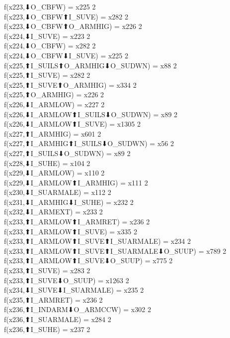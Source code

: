 f(x223,⬇O_CBFW) = x225 {2} \\
f(x223,⬇O_CBFW⬆I_SUVE) = x282 {2} \\
f(x223,⬇O_CBFW⬆O_ARMHIG) = x226 {2} \\
f(x224,⬇I_SUVE) = x223 {2} \\
f(x224,⬇O_CBFW) = x282 {2} \\
f(x224,⬇O_CBFW⬇I_SUVE) = x225 {2} \\
f(x225,⬆I_SUILS⬆O_ARMHIG⬇O_SUDWN) = x88 {2} \\
f(x225,⬆I_SUVE) = x282 {2} \\
f(x225,⬆I_SUVE⬆O_ARMHIG) = x334 {2} \\
f(x225,⬆O_ARMHIG) = x226 {2} \\
f(x226,⬇I_ARMLOW) = x227 {2} \\
f(x226,⬇I_ARMLOW⬆I_SUILS⬇O_SUDWN) = x89 {2} \\
f(x226,⬇I_ARMLOW⬆I_SUVE) = x1305 {2} \\
f(x227,⬆I_ARMHIG) = x601 {2} \\
f(x227,⬆I_ARMHIG⬆I_SUILS⬇O_SUDWN) = x56 {2} \\
f(x227,⬆I_SUILS⬇O_SUDWN) = x89 {2} \\
f(x228,⬇I_SUHE) = x104 {2} \\
f(x229,⬇I_ARMLOW) = x110 {2} \\
f(x229,⬇I_ARMLOW⬆I_ARMHIG) = x111 {2} \\
f(x230,⬇I_SUARMALE) = x112 {2} \\
f(x231,⬇I_ARMHIG⬇I_SUHE) = x232 {2} \\
f(x232,⬇I_ARMEXT) = x233 {2} \\
f(x233,⬆I_ARMLOW⬆I_ARMRET) = x236 {2} \\
f(x233,⬆I_ARMLOW⬆I_SUVE) = x335 {2} \\
f(x233,⬆I_ARMLOW⬆I_SUVE⬆I_SUARMALE) = x234 {2} \\
f(x233,⬆I_ARMLOW⬆I_SUVE⬆I_SUARMALE⬇O_SUUP) = x789 {2} \\
f(x233,⬆I_ARMLOW⬆I_SUVE⬇O_SUUP) = x775 {2} \\
f(x233,⬆I_SUVE) = x283 {2} \\
f(x233,⬆I_SUVE⬇O_SUUP) = x1263 {2} \\
f(x234,⬇I_SUVE⬇I_SUARMALE) = x235 {2} \\
f(x235,⬆I_ARMRET) = x236 {2} \\
f(x236,⬆I_INDARM⬇O_ARMCCW) = x302 {2} \\
f(x236,⬆I_SUARMALE) = x284 {2} \\
f(x236,⬆I_SUHE) = x237 {2} \\
